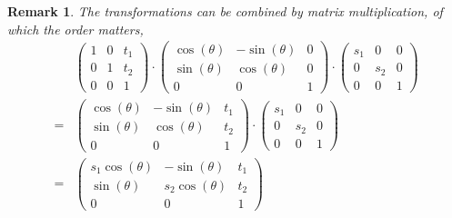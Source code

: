 \documentclass[a4paper]{article}
\theoremstyle{definition}
\theoremstyle{plain}
\newtheorem{remark}{Remark}
\begin{document}
\begin{remark}
The transformations can be combined by matrix multiplication, of which the order matters,
\begin{align*}
    &\begin{pmatrix} 
        1 & 0 & t_1\\ 
        0 & 1 & t_2\\ 
        0 & 0 & 1
    \end{pmatrix}\cdot
    \begin{pmatrix} 
        \cos(\theta) & -\sin(\theta) & 0\\ 
        \sin(\theta) & \cos(\theta) & 0\\ 
        0 & 0 & 1
    \end{pmatrix}\cdot
    \begin{pmatrix} 
        s_{1} & 0 & 0\\ 
        0 & s_{2} & 0\\ 
        0 & 0 & 1
    \end{pmatrix}\\
    =&\begin{pmatrix} 
        \cos(\theta) & -\sin(\theta) & t_1\\ 
        \sin(\theta) & \cos(\theta) & t_2\\ 
        0 & 0 & 1
    \end{pmatrix}\cdot
    \begin{pmatrix} 
        s_{1} & 0 & 0\\ 
        0 & s_{2} & 0\\ 
        0 & 0 & 1
    \end{pmatrix}\\
    =&\begin{pmatrix} 
        s_1\cos(\theta) & -\sin(\theta) & t_1\\ 
        \sin(\theta) & s_2\cos(\theta) & t_2\\ 
        0 & 0 & 1
    \end{pmatrix}
\end{align*}


\end{remark}
\end{document}
